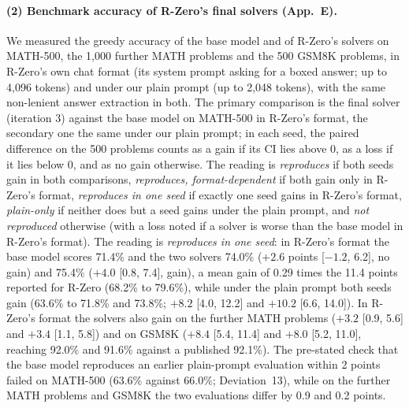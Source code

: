 \documentclass[10pt,a4paper]{article}
\begin{document}
\paragraph{(2) Benchmark accuracy of R-Zero's final solvers (App.~E).} We measured the greedy accuracy of the base model and of R-Zero's solvers on MATH-500, the 1,000 further MATH problems and the 500 GSM8K problems, in R-Zero's own chat format (its system prompt asking for a boxed answer; up to 4,096 tokens) and under our plain prompt (up to 2,048 tokens), with the same non-lenient answer extraction in both. The primary comparison is the final solver (iteration 3) against the base model on MATH-500 in R-Zero's format, the secondary one the same under our plain prompt; in each seed, the paired difference on the 500 problems counts as a gain if its CI lies above 0, as a loss if it lies below 0, and as no gain otherwise. The reading is \emph{reproduces} if both seeds gain in both comparisons, \emph{reproduces, format-dependent} if both gain only in R-Zero's format, \emph{reproduces in one seed} if exactly one seed gains in R-Zero's format, \emph{plain-only} if neither does but a seed gains under the plain prompt, and \emph{not reproduced} otherwise (with a loss noted if a solver is worse than the base model in R-Zero's format). The reading is \emph{reproduces in one seed}: in R-Zero's format the base model scores 71.4\% and the two solvers 74.0\% ($+2.6$ points [$-1.2$, 6.2], no gain) and 75.4\% ($+4.0$ [0.8, 7.4], gain), a mean gain of 0.29 times the 11.4 points reported for R-Zero (68.2\% to 79.6\%), while under the plain prompt both seeds gain (63.6\% to 71.8\% and 73.8\%; $+8.2$ [4.0, 12.2] and $+10.2$ [6.6, 14.0]). In R-Zero's format the solvers also gain on the further MATH problems ($+3.2$ [0.9, 5.6] and $+3.4$ [1.1, 5.8]) and on GSM8K ($+8.4$ [5.4, 11.4] and $+8.0$ [5.2, 11.0], reaching 92.0\% and 91.6\% against a published 92.1\%). The pre-stated check that the base model reproduces an earlier plain-prompt evaluation within 2 points failed on MATH-500 (63.6\% against 66.0\%; Deviation~13), while on the further MATH problems and GSM8K the two evaluations differ by 0.9 and 0.2 points.
\end{document}
